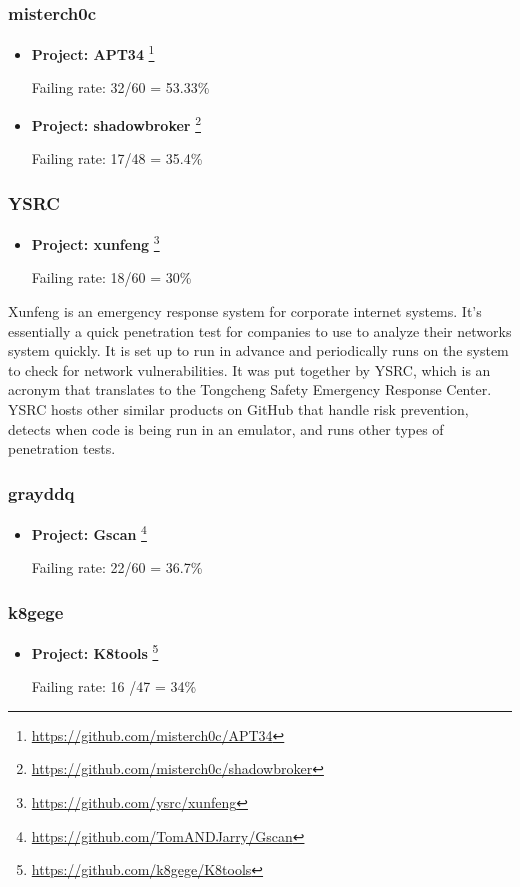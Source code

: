 \documentclass[]{acmart}
\begin{document}
\subsubsection{misterch0c}
\begin{itemize}
    \item { \bf Project: APT34 }\footnote{\url{ https://github.com/misterch0c/APT34}}
    
    Failing rate: 32/60 = 53.33\%
    \newline
    
    \item { \bf Project: shadowbroker }\footnote{\url{https://github.com/misterch0c/shadowbroker}}
    
    Failing rate: 17/48 = 35.4\%
\end{itemize}

\subsubsection{YSRC}
\begin{itemize}
    \item { \bf Project: xunfeng }\footnote{\url{https://github.com/ysrc/xunfeng}}
    
    Failing rate: 18/60 = 30\%
\end{itemize}

Xunfeng is an emergency response system for corporate internet systems. It's essentially a quick penetration test for companies to use to analyze their networks system quickly. It is set up to run in advance and periodically runs on the system to check for network vulnerabilities. It was put together by YSRC, which is an acronym that translates to the Tongcheng Safety Emergency Response Center. YSRC hosts other similar products on GitHub that handle risk prevention, detects when code is being run in an emulator, and runs other types of penetration tests.

\subsubsection{grayddq}
\begin{itemize}
    \item { \bf Project: Gscan }\footnote{\url{https://github.com/TomANDJarry/Gscan}}
    
    Failing rate: 22/60 = 36.7\%
\end{itemize}

\subsubsection{k8gege}
\begin{itemize}
    \item { \bf Project: K8tools }\footnote{\url{https://github.com/k8gege/K8tools}}
    
    Failing rate: 16 /47 = 34\%
\end{itemize}
\end{document}
